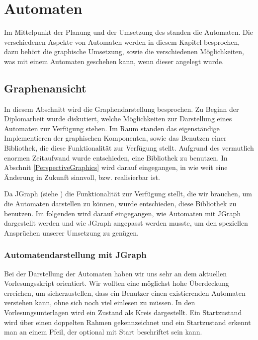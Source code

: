 

\chapter{Automaten}\label{Machines}

Im Mittelpunkt der Planung und der Umsetzung des \gtitools standen die
Automaten. Die verschiedenen Aspekte von Automaten werden in diesem Kapitel
besprochen, dazu behört die graphische Umsetzung, sowie die verschiedenen
Möglichkeiten, was mit einem Automaten geschehen kann, wenn dieser angelegt
wurde.\vspace{10pt}


\section{Graphenansicht}\label{Graph}

In diesem Abschnitt wird die Graphendarstellung besprochen. Zu Beginn der
Diplomarbeit wurde diskutiert, welche Möglichkeiten zur Darstellung eines
Automaten zur Verfügung stehen. Im Raum standen das eigenständige
Implementieren der graphischen Komponenten, sowie das Benutzen einer
Bibliothek, die diese Funktionalität zur Verfügung stellt. Aufgrund des
vermutlich enormen Zeitaufwand wurde entschieden, eine Bibliothek zu benutzen.
In Abschnit \ref{PerspectiveGraphics} wird darauf eingegangen, in wie weit eine
Änderung in Zukunft sinnvoll, bzw. realisierbar ist.\vspace{10pt} 

Da JGraph (siehe \cite{jgraph}) die Funktionalität zur Verfügung stellt, die
wir brauchen, um die Automaten darstellen zu können, wurde entschieden, diese
Bibliothek zu benutzen. Im folgenden wird darauf eingegangen, wie Automaten mit
JGraph dargestellt werden und wie JGraph angepasst werden musste, um den
speziellen Ansprüchen unserer Umsetzung zu genügen.\vspace{10pt}


\subsection{Automatendarstellung mit JGraph}\label{GraphJGraph}

Bei der Darstellung der Automaten haben wir uns sehr an dem aktuellen
Vorlesungsskript orientiert. Wir wollten eine möglichst hohe Überdeckung
erreichen, um sicherzustellen, dass ein Benutzer einen existierenden Automaten
verstehen kann, ohne sich noch viel einlesen zu müssen. In den
Vorlesungsunterlagen wird ein Zustand als Kreis dargestellt. Ein Startzustand
wird über einen doppelten Rahmen gekennzeichnet und ein Startzustand erkennt man
an einem Pfeil, der optional mit Start beschriftet sein kann.\vspace{10pt}

